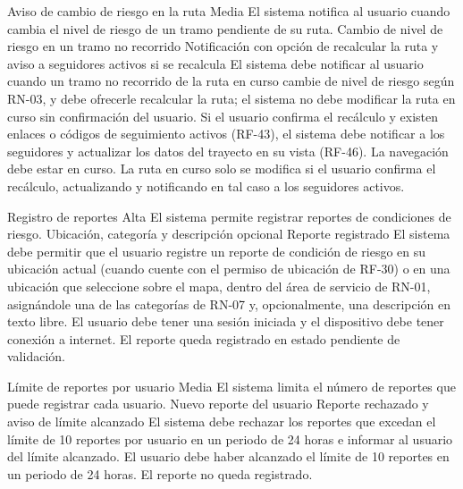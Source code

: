   {Aviso de cambio de riesgo en la ruta}%
  {Media}%
  {El sistema notifica al usuario cuando cambia el nivel de riesgo de un tramo pendiente de su ruta.}%
  {Cambio de nivel de riesgo en un tramo no recorrido}%
  {Notificación con opción de recalcular la ruta y aviso a seguidores activos si se recalcula}%
  {El sistema debe notificar al usuario cuando un tramo no recorrido de la ruta en curso cambie de nivel de riesgo según RN-03, y debe ofrecerle recalcular la ruta; el sistema no debe modificar la ruta en curso sin confirmación del usuario. Si el usuario confirma el recálculo y existen enlaces o códigos de seguimiento activos (RF-43), el sistema debe notificar a los seguidores y actualizar los datos del trayecto en su vista (RF-46).}%
  {La navegación debe estar en curso.}%
  {La ruta en curso solo se modifica si el usuario confirma el recálculo, actualizando y notificando en tal caso a los seguidores activos.}%

  {Registro de reportes}%
  {Alta}%
  {El sistema permite registrar reportes de condiciones de riesgo.}%
  {Ubicación, categoría y descripción opcional}%
  {Reporte registrado}%
  {El sistema debe permitir que el usuario registre un reporte de condición de riesgo en su ubicación actual (cuando cuente con el permiso de ubicación de RF-30) o en una ubicación que seleccione sobre el mapa, dentro del área de servicio de RN-01, asignándole una de las categorías de RN-07 y, opcionalmente, una descripción en texto libre.}%
  {El usuario debe tener una sesión iniciada y el dispositivo debe tener conexión a internet.}%
  {El reporte queda registrado en estado pendiente de validación.}%

  {Límite de reportes por usuario}%
  {Media}%
  {El sistema limita el número de reportes que puede registrar cada usuario.}%
  {Nuevo reporte del usuario}%
  {Reporte rechazado y aviso de límite alcanzado}%
  {El sistema debe rechazar los reportes que excedan el límite de 10 reportes por usuario en un periodo de 24 horas e informar al usuario del límite alcanzado.}%
  {El usuario debe haber alcanzado el límite de 10 reportes en un periodo de 24 horas.}%
  {El reporte no queda registrado.}%

